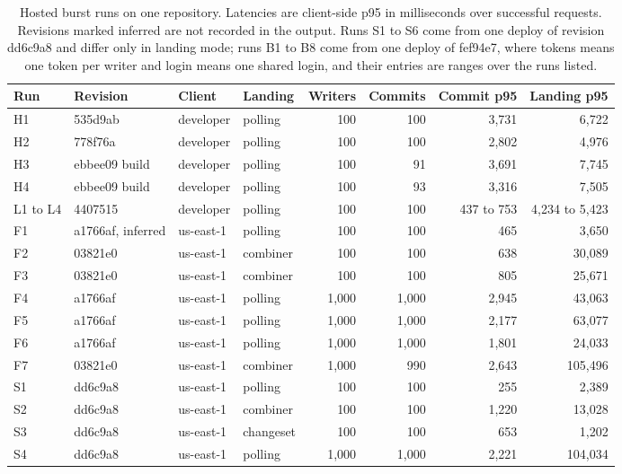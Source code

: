 \documentclass[11pt,letterpaper]{article}
\theoremstyle{definition}
\theoremstyle{remark}
\begin{document}
\begin{table}[t]
\centering
\caption{Hosted burst runs on one repository. Latencies are client-side p95 in milliseconds over successful requests. Revisions marked inferred are not recorded in the output. Runs S1 to S6 come from one deploy of revision dd6c9a8 and differ only in landing mode; runs B1 to B8 come from one deploy of fef94e7, where tokens means one token per writer and login means one shared login, and their entries are ranges over the runs listed.}
\label{tab:sgoc:hosted}
\small
\setlength{\tabcolsep}{4pt}
\begin{tabular}{@{}llllrrrr@{}}
\toprule
Run & Revision & Client & Landing & Writers & Commits & Commit p95 & Landing p95 \\
\midrule
H1 & 535d9ab & developer & polling & 100 & 100 & 3,731 & 6,722 \\ %
H2 & 778f76a & developer & polling & 100 & 100 & 2,802 & 4,976 \\ %
H3 & ebbee09 build & developer & polling & 100 & 91 & 3,691 & 7,745 \\ %
H4 & ebbee09 build & developer & polling & 100 & 93 & 3,316 & 7,505 \\ %
L1 to L4 & 4407515 & developer & polling & 100 & 100 & 437 to 753 & 4,234 to 5,423 \\ %
F1 & a1766af, inferred & us-east-1 & polling & 100 & 100 & 465 & 3,650 \\ %
F2 & 03821e0 & us-east-1 & combiner & 100 & 100 & 638 & 30,089 \\ %
F3 & 03821e0 & us-east-1 & combiner & 100 & 100 & 805 & 25,671 \\ %
F4 & a1766af & us-east-1 & polling & 1,000 & 1,000 & 2,945 & 43,063 \\ %
F5 & a1766af & us-east-1 & polling & 1,000 & 1,000 & 2,177 & 63,077 \\ %
F6 & a1766af & us-east-1 & polling & 1,000 & 1,000 & 1,801 & 24,033 \\ %
F7 & 03821e0 & us-east-1 & combiner & 1,000 & 990 & 2,643 & 105,496 \\ %
\midrule
S1 & dd6c9a8 & us-east-1 & polling & 100 & 100 & 255 & 2,389 \\ %
S2 & dd6c9a8 & us-east-1 & combiner & 100 & 100 & 1,220 & 13,028 \\ %
S3 & dd6c9a8 & us-east-1 & changeset & 100 & 100 & 653 & 1,202 \\ %
S4 & dd6c9a8 & us-east-1 & polling & 1,000 & 1,000 & 2,221 & 104,034 \\ %

\end{tabular}
\end{table}
\end{document}
